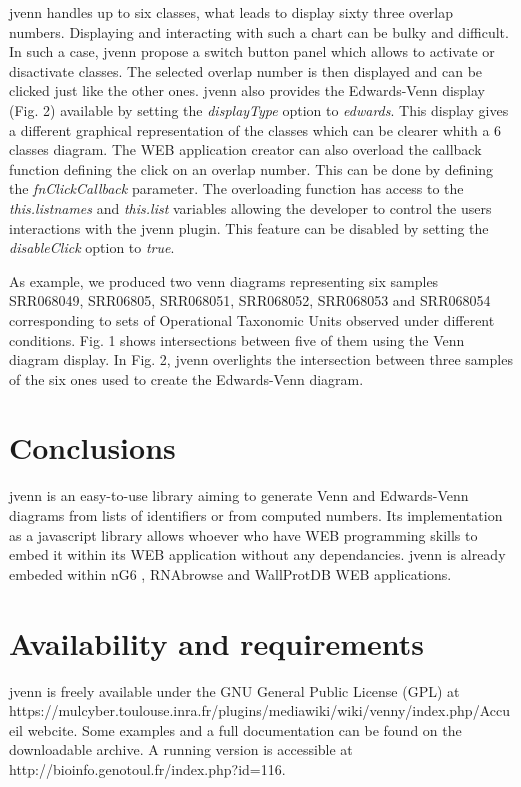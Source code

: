 \documentclass{bmcart}
\begin{document}
jvenn handles up to six classes, what leads to display sixty three overlap numbers. Displaying and interacting with such a chart
can be bulky and difficult. In such a case, jvenn propose a switch button panel which allows to activate or disactivate classes. 
The selected overlap number is then displayed and can be clicked just like the other ones. jvenn also provides the Edwards-Venn
display (Fig. 2) available by setting the \textit{displayType} option to \textit{edwards}. This display gives a different 
graphical representation of the classes which can be clearer whith a 6 classes diagram.
The WEB application creator can also overload the callback function defining the click on an overlap number. This can be done 
by defining the \textit{fnClickCallback} parameter. The overloading function has access to the \textit{this.listnames} and
\textit{this.list} variables allowing the developer to control the users interactions with the jvenn plugin. This feature can
be disabled by setting the \textit{disableClick} option to \textit{true}.

As example, we produced two venn diagrams representing six samples SRR068049, SRR06805, SRR068051, SRR068052, SRR068053 and 
SRR068054 corresponding to sets of Operational Taxonomic Units observed under different conditions. Fig. 1 shows intersections
between five of them using the Venn diagram display. In Fig. 2, jvenn overlights the intersection between three samples of the 
six ones used to create the Edwards-Venn diagram.


\section*{Conclusions}

jvenn is an easy-to-use library aiming to generate Venn and Edwards-Venn diagrams from lists of identifiers or from
computed numbers. Its implementation as a javascript library allows whoever who have WEB programming skills to embed 
it within its WEB application without any dependancies. jvenn is already embeded within nG6 \cite{Mariette2012}, 
RNAbrowse \cite{Mariette} and WallProtDB \cite{SanClemente} WEB applications.

\section*{Availability and requirements}

jvenn is freely available under the GNU General Public License (GPL) at 
https://mulcyber.toulouse.inra.fr/plugins/mediawiki/wiki/venny/index.php/Accueil webcite. Some examples and a full documentation 
can be found on the downloadable archive. A running version is accessible at http://bioinfo.genotoul.fr/index.php?id=116.
\end{document}
